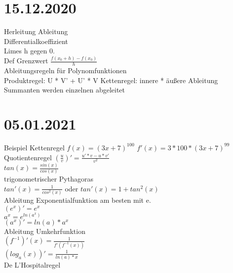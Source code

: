 \documentclass{article}
\begin{document}
	\section*{15.12.2020}
	Herleitung Ableitung \\
	Differentialkoeffizient \\
	Limes h  gegen 0. \\
	Def Grenzwert $\frac{f(x_{0} + h) - f(x_{0})}{h}$ \\
	Ableitungsregeln für Polynomfunktionen \\
	Produktregel: U * V' + U' * V
	Kettenregel: innere * äußere Ableitung
	Summanten werden einzelnen abgeleitet
	\section*{05.01.2021}
	Beispiel Kettenregel $f(x) = (3x + 7)^{100}$ $f'(x) = 3 * 100 * (3x+7)^{99}$
	Quotientenregel
	$(\frac{u}{v})' = \frac{u' * v - u * v'}{v^2}$ \\
	$tan(x) = \frac{sin(x)}{cos(x)}$ \\
	trigonometrischer Pythagoras \\
	$tan'(x) = \frac{1}{cos^2(x)}$ oder $tan'(x) = 1 + tan^2(x)$ \\
	Ableitung Exponentialfunktion
	am besten mit e. \\
	$(e^x)' = e^x$ \\
	$a^x = e^{ln(a^x)}$ \\
	$(a^x)' = ln(a) * a^x$ \\
	Ableitung Umkehrfunktion \\
	$(f^{-1})'(x) = \frac{1}{f'(f^{-1}(x))}$ \\
	$(log_a(x))' = \frac{1}{ln(a) * x}$ \\
	De L'Hospitalregel
\end{document}

